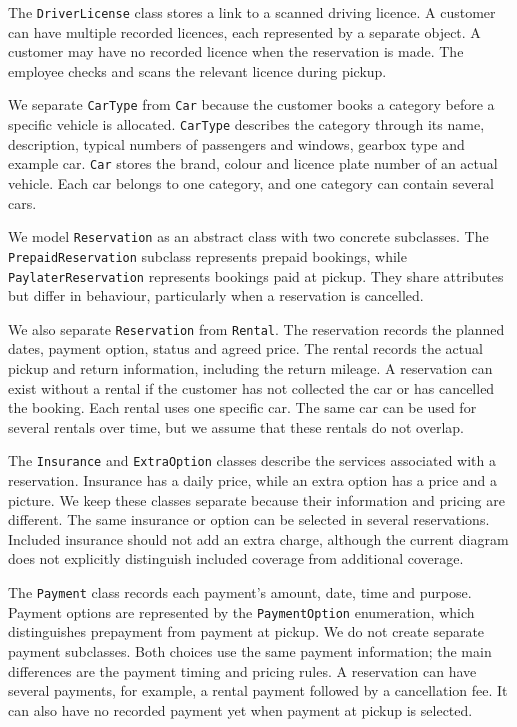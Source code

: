 \documentclass[12pt,a4paper]{report}
\begin{document}
The \texttt{DriverLicense} class stores a link to a scanned driving licence. A customer can have multiple recorded licences, each represented by a separate object. A customer may have no recorded licence when the reservation is made. The employee checks and scans the relevant licence during pickup.

We separate \texttt{CarType} from \texttt{Car} because the customer books a category before a specific vehicle is allocated. \texttt{CarType} describes the category through its name, description, typical numbers of passengers and windows, gearbox type and example car. \texttt{Car} stores the brand, colour and licence plate number of an actual vehicle. Each car belongs to one category, and one category can contain several cars.

We model \texttt{Reservation} as an abstract class with two concrete subclasses. The \texttt{PrepaidReservation} subclass represents prepaid bookings, while \texttt{PaylaterReservation} represents bookings paid at pickup. They share attributes but differ in behaviour, particularly when a reservation is cancelled.

We also separate \texttt{Reservation} from \texttt{Rental}. The reservation records the planned dates, payment option, status and agreed price. The rental records the actual pickup and return information, including the return mileage. A reservation can exist without a rental if the customer has not collected the car or has cancelled the booking. Each rental uses one specific car. The same car can be used for several rentals over time, but we assume that these rentals do not overlap.

The \texttt{Insurance} and \texttt{ExtraOption} classes describe the services associated with a reservation. Insurance has a daily price, while an extra option has a price and a picture. We keep these classes separate because their information and pricing are different. The same insurance or option can be selected in several reservations. Included insurance should not add an extra charge, although the current diagram does not explicitly distinguish included coverage from additional coverage.

The \texttt{Payment} class records each payment's amount, date, time and purpose. Payment options are represented by the \texttt{PaymentOption} enumeration, which distinguishes prepayment from payment at pickup. We do not create separate payment subclasses. Both choices use the same payment information; the main differences are the payment timing and pricing rules. A reservation can have several payments, for example, a rental payment followed by a cancellation fee. It can also have no recorded payment yet when payment at pickup is selected.
\end{document}
